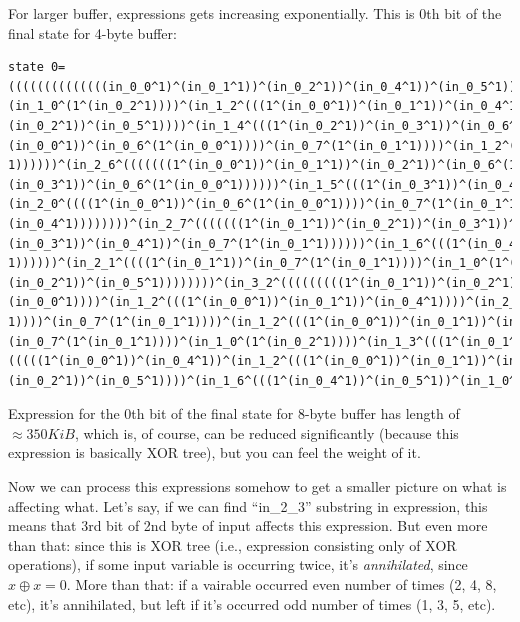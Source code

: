 For larger buffer, expressions gets increasing exponentially.
This is 0th bit of the final state for 4-byte buffer:

\begin{lstlisting}
state 0=((((((((((((((in_0_0^1)^(in_0_1^1))^(in_0_2^1))^(in_0_4^1))^(in_0_5^1))^(in_0_7^(1^(in_0_1^1))))^
(in_1_0^(1^(in_0_2^1))))^(in_1_2^(((1^(in_0_0^1))^(in_0_1^1))^(in_0_4^1))))^(in_1_3^(((1^(in_0_1^1))^
(in_0_2^1))^(in_0_5^1))))^(in_1_4^(((1^(in_0_2^1))^(in_0_3^1))^(in_0_6^(1^(in_0_0^1))))))^(in_2_0^((((1^
(in_0_0^1))^(in_0_6^(1^(in_0_0^1))))^(in_0_7^(1^(in_0_1^1))))^(in_1_2^(((1^(in_0_0^1))^(in_0_1^1))^(in_0_4^
1))))))^(in_2_6^(((((((1^(in_0_0^1))^(in_0_1^1))^(in_0_2^1))^(in_0_6^(1^(in_0_0^1))))^(in_1_4^(((1^(in_0_2^1))^
(in_0_3^1))^(in_0_6^(1^(in_0_0^1))))))^(in_1_5^(((1^(in_0_3^1))^(in_0_4^1))^(in_0_7^(1^(in_0_1^1))))))^
(in_2_0^((((1^(in_0_0^1))^(in_0_6^(1^(in_0_0^1))))^(in_0_7^(1^(in_0_1^1))))^(in_1_2^(((1^(in_0_0^1))^(in_0_1^1))^
(in_0_4^1))))))))^(in_2_7^(((((((1^(in_0_1^1))^(in_0_2^1))^(in_0_3^1))^(in_0_7^(1^(in_0_1^1))))^(in_1_5^(((1^
(in_0_3^1))^(in_0_4^1))^(in_0_7^(1^(in_0_1^1))))))^(in_1_6^(((1^(in_0_4^1))^(in_0_5^1))^(in_1_0^(1^(in_0_2^
1))))))^(in_2_1^((((1^(in_0_1^1))^(in_0_7^(1^(in_0_1^1))))^(in_1_0^(1^(in_0_2^1))))^(in_1_3^(((1^(in_0_1^1))^
(in_0_2^1))^(in_0_5^1))))))))^(in_3_2^(((((((((1^(in_0_1^1))^(in_0_2^1))^(in_0_4^1))^(in_0_5^1))^(in_0_6^(1^
(in_0_0^1))))^(in_1_2^(((1^(in_0_0^1))^(in_0_1^1))^(in_0_4^1))))^(in_2_0^((((1^(in_0_0^1))^(in_0_6^(1^(in_0_0^
1))))^(in_0_7^(1^(in_0_1^1))))^(in_1_2^(((1^(in_0_0^1))^(in_0_1^1))^(in_0_4^1))))))^(in_2_1^((((1^(in_0_1^1))^
(in_0_7^(1^(in_0_1^1))))^(in_1_0^(1^(in_0_2^1))))^(in_1_3^(((1^(in_0_1^1))^(in_0_2^1))^(in_0_5^1))))))^(in_2_4^
(((((1^(in_0_0^1))^(in_0_4^1))^(in_1_2^(((1^(in_0_0^1))^(in_0_1^1))^(in_0_4^1))))^(in_1_3^(((1^(in_0_1^1))^
(in_0_2^1))^(in_0_5^1))))^(in_1_6^(((1^(in_0_4^1))^(in_0_5^1))^(in_1_0^(1^(in_0_2^1))))))))))
\end{lstlisting}

Expression for the 0th bit of the final state for 8-byte buffer has length of $\approx 350KiB$,
which is, of course, can be reduced
significantly (because this expression is basically XOR tree), but you can feel the weight of it.

Now we can process this expressions somehow to get a smaller picture on what is affecting what.
Let's say, if we can find ``in\_2\_3'' substring in expression, this means that 3rd bit of 2nd byte of input
affects this expression.
But even more than that: since this is XOR tree (i.e., expression consisting only of XOR operations),
if some input variable is occurring twice, it's \textit{annihilated}, since $x \oplus x=0$.
More than that: if a vairable occurred even number of times (2, 4, 8, etc), it's annihilated, but left if it's occurred
odd number of times (1, 3, 5, etc).

